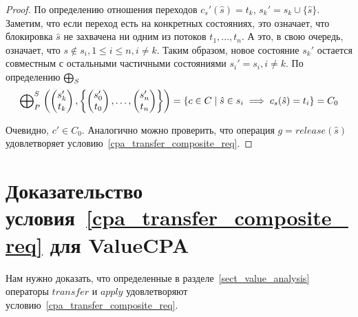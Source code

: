 \begin{proof}
По определению отношения переходов $c_s'(\hat s) = t_k$, $s_k' = s_k \cup \{\hat s\}$.
Заметим, что если переход есть на конкретных состояниях, это означает, что блокировка $\hat s$ не захвачена ни одним из потоков $t_1, \dots, t_n$.
А это, в свою очередь, означает, что $s \notin s_i, 1 \le i \le n, i \neq k$.
Таким образом, новое состояние $s_k'$ остается совместным с остальными частичными состояниями $s_i' = s_i, i \neq k$.
По определению $\mathrel{\bigoplus}_S$
\begin{align*}
\mathrel{\bigoplus}^S_P
\left(
\begin{pmatrix}
s_k' \\
t_k 
\end{pmatrix},
\left\{
\begin{pmatrix}
s_0' \\
t_0 
\end{pmatrix},
\dots ,
\begin{pmatrix}
s_n' \\
t_n 
\end{pmatrix}
\right\}
\right) = \{ c \in C \mid \hat s \in s_i \implies c_s(\hat s) = t_i \} = C_0
\end{align*}

Очевидно, $c' \in C_0$.
Аналогично можно проверить, что операция $g = release(\hat s)$ удовлетворяет условию~\ref{cpa_transfer_composite_req}. 

\end{proof}


\section{Доказательство условия~\ref{cpa_transfer_composite_req} для ValueCPA}
\label{sect_transfer_value_proof}

Нам нужно доказать, что определенные в разделе~\ref{sect_value_analysis} операторы $transfer$ и $apply$ удовлетворяют условию~\ref{cpa_transfer_composite_req}.


